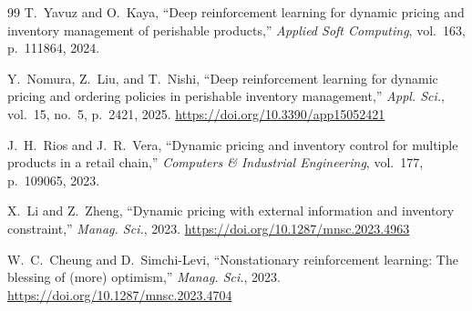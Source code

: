 \documentclass[journal, 10pt, twoside]{IEEEtran}
\begin{document}
\begin{thebibliography}{99}
T.~Yavuz and O.~Kaya,
``Deep reinforcement learning for dynamic pricing and inventory
management of perishable products,''
\textit{Applied Soft Computing}, vol.~163, p.~111864, 2024.

Y.~Nomura, Z.~Liu, and T.~Nishi,
``Deep reinforcement learning for dynamic pricing and ordering policies
in perishable inventory management,''
\textit{Appl. Sci.}, vol.~15, no.~5, p.~2421, 2025.
\url{https://doi.org/10.3390/app15052421}

J.~H.~Rios and J.~R.~Vera,
``Dynamic pricing and inventory control for multiple products in a
retail chain,''
\textit{Computers \& Industrial Engineering}, vol.~177, p.~109065, 2023.


X.~Li and Z.~Zheng,
``Dynamic pricing with external information and inventory constraint,''
\textit{Manag. Sci.}, 2023.
\url{https://doi.org/10.1287/mnsc.2023.4963}

W.~C.~Cheung and D.~Simchi-Levi,
``Nonstationary reinforcement learning: The blessing of (more) optimism,''
\textit{Manag. Sci.}, 2023.
\url{https://doi.org/10.1287/mnsc.2023.4704}


\end{thebibliography}
\end{document}
